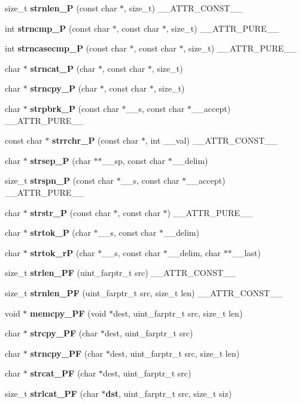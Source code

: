 \begin{DoxyCompactItemize}
\item 
size\_\-t {\bf strnlen\_\-P} (const char $\ast$, size\_\-t) \_\-\_\-ATTR\_\-CONST\_\-\_\-
\item 
int {\bf strncmp\_\-P} (const char $\ast$, const char $\ast$, size\_\-t) \_\-\_\-ATTR\_\-PURE\_\-\_\-
\item 
int {\bf strncasecmp\_\-P} (const char $\ast$, const char $\ast$, size\_\-t) \_\-\_\-ATTR\_\-PURE\_\-\_\-
\item 
char $\ast$ {\bf strncat\_\-P} (char $\ast$, const char $\ast$, size\_\-t)
\item 
char $\ast$ {\bf strncpy\_\-P} (char $\ast$, const char $\ast$, size\_\-t)
\item 
char $\ast$ {\bf strpbrk\_\-P} (const char $\ast$\_\-\_\-s, const char $\ast$\_\-\_\-accept) \_\-\_\-ATTR\_\-PURE\_\-\_\-
\item 
const char $\ast$ {\bf strrchr\_\-P} (const char $\ast$, int \_\-\_\-val) \_\-\_\-ATTR\_\-CONST\_\-\_\-
\item 
char $\ast$ {\bf strsep\_\-P} (char $\ast$$\ast$\_\-\_\-sp, const char $\ast$\_\-\_\-delim)
\item 
size\_\-t {\bf strspn\_\-P} (const char $\ast$\_\-\_\-s, const char $\ast$\_\-\_\-accept) \_\-\_\-ATTR\_\-PURE\_\-\_\-
\item 
char $\ast$ {\bf strstr\_\-P} (const char $\ast$, const char $\ast$) \_\-\_\-ATTR\_\-PURE\_\-\_\-
\item 
char $\ast$ {\bf strtok\_\-P} (char $\ast$\_\-\_\-s, const char $\ast$\_\-\_\-delim)
\item 
char $\ast$ {\bf strtok\_\-rP} (char $\ast$\_\-\_\-s, const char $\ast$\_\-\_\-delim, char $\ast$$\ast$\_\-\_\-last)
\item 
size\_\-t {\bf strlen\_\-PF} (uint\_\-farptr\_\-t src) \_\-\_\-ATTR\_\-CONST\_\-\_\-
\item 
size\_\-t {\bf strnlen\_\-PF} (uint\_\-farptr\_\-t src, size\_\-t len) \_\-\_\-ATTR\_\-CONST\_\-\_\-
\item 
void $\ast$ {\bf memcpy\_\-PF} (void $\ast$dest, uint\_\-farptr\_\-t src, size\_\-t len)
\item 
char $\ast$ {\bf strcpy\_\-PF} (char $\ast$dest, uint\_\-farptr\_\-t src)
\item 
char $\ast$ {\bf strncpy\_\-PF} (char $\ast$dest, uint\_\-farptr\_\-t src, size\_\-t len)
\item 
char $\ast$ {\bf strcat\_\-PF} (char $\ast$dest, uint\_\-farptr\_\-t src)
\item 
size\_\-t {\bf strlcat\_\-PF} (char $\ast${\bf dst}, uint\_\-farptr\_\-t src, size\_\-t siz)

\end{DoxyCompactItemize}
